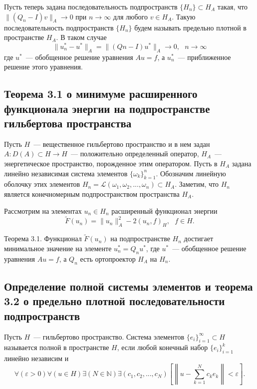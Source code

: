 \documentclass[a4paper,14pt]{article} %
\begin{document}
Пусть теперь задана последовательность подпространств
$\{H_n \} \subset H_A$ такая, что $\|(Q_n - I)v\|_A \to 0$ при
$n \to \infty$ для любого $v \in H_A$.
Такую последовательность подпространств $\{H_n \}$
будем называть предельно плотной в пространстве $H_A$.
В таком случае
\begin{equation}
	\|u^*_n - u^*\|_A = \|(Q n - I)u^* \|_A \to 0,
	~~~
	n\to\infty
\end{equation}
где $u^*$~--- обобщенное решение уравнения $Au = f$,
а $u^*_n$~--- приближенное решение этого уравнения.


\subsection{Теорема 3.1 о минимуме расширенного функционала энергии на подпространстве гильбертова пространства}

Пусть $H$~--- вещественное гильбертово пространство и в нем задан
$A : D(A) \subset H \to H$~--- положительно определенный оператор,
$H_A$~--- энергетическое пространство, порожденное этим оператором.
Пусть в $H_A$ задана линейно независимая система элементов $\{\omega_k\}_{k=1}^n$.
Обозначим линейную оболочку этих элементов $H_n = \mathcal{L}(\omega_1, \omega_2 , ... , \omega_n ) \subset H_A$.
Заметим, что $H_n$ является конечномерным подпространством пространства $H_A$.

Рассмотрим на элементах $u_n \in H_n$ расширенный функционал энергии
\begin{equation}
	\tilde{F}(u_n ) = \|u_n \|^2_A - 2(u_n, f )_H ,
	~~~
	f \in H.
\end{equation}

Теорема 3.1.
Функционал $\tilde{F}(u_n)$ на подпространстве $H_n$ достигает
минимальное значение на элементе $u^*_n = Q_n u^*$,
где $u^*$~--- обобщенное решение уравнения $Au = f$, а $Q_n$ есть ортопроектор $H_A$ на $H_n$.


\subsection{Определение полной системы элементов и теорема 3.2 о предельно плотной последовательности подпространств}

Пусть $H$~--- гильбертово пространство.
Система элементов $\{e_i \}_{i=1}^\infty \subset H$
называется полной в пространстве $H$, если любой конечный набор $\{e_i \}_{i=1}^k$ линейно независим
и
\begin{equation}
	\forall(\varepsilon > 0)
	\forall(u\in H)
	\exists(N\in\mathbb{N})
	\exists(c_1, c_2, ..., c_N)
	\left[
		\left\|u-\sum_{k=1}^N c_k e_k\right\| < \varepsilon
	\right]
	.
\end{equation}
\end{document}
